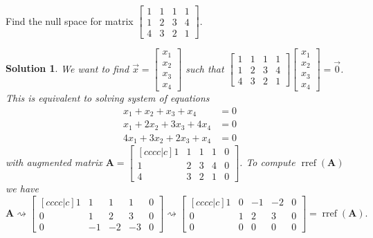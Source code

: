 \documentclass[]{book}
\DeclareMathOperator{\rref}{rref}
\newcommand{\vecxxxx}[1][x]{\ensuremath{\begin{bmatrix}
#1_1 \\
#1_2 \\
#1_3 \\
#1_4
\end{bmatrix}}}
\newtheorem*{solution}{Solution}
\begin{document}
\begin{example}
    \label{expl:find null space}
    Find the null space for matrix $\begin{bmatrix}1 & 1 & 1 & 1 \\ 1 & 2 & 3 & 4 \\ 4 & 3 & 2 & 1\end{bmatrix}$.
\begin{solution}
    We want to find $\vec{x} = \vecxxxx$ such that
    $\begin{bmatrix}1 & 1 & 1 & 1 \\ 1 & 2 & 3 & 4 \\ 4 & 3 & 2 & 1\end{bmatrix} \vecxxxx = \vec{0}$. This is equivalent to solving system of equations
    \begin{align*}
        x_1 + x_2 + x_3 + x_4 &= 0 \\
        x_1 + 2x_2 + 3x_3 + 4x_4 &= 0\\
        4x_1 + 3x_2 + 2x_3 + x_4 &= 0
    \end{align*}
    with augmented matrix $\mathbf{A} = 
    \begin{bmatrix}[cccc|c] 
    1&1&1&1&0\\
    1&2&3&4&0\\
    4&3&2&1&0
    \end{bmatrix}$. 
    To compute $\rref(\mathbf{A})$ we have
    \[\mathbf{A} \rightsquigarrow 
    \begin{bmatrix}[cccc|c] 
    \boxed{1}&1&1&1&0\\
    0&1&2&3&0\\
    0&-1&-2&-3&0
    \end{bmatrix}
    \rightsquigarrow
    \begin{bmatrix}[cccc|c] 
    \boxed{1}&0&-1&-2&0\\
    0&\boxed{1}&2&3&0\\
    0&0&0&0&0
    \end{bmatrix}
    =\rref(\mathbf{A}).
    \]
    

\end{solution}
\end{example}
\end{document}
